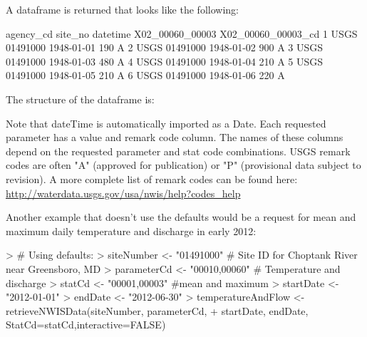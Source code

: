 \documentclass[a4paper,11pt]{article}
\begin{document}
A dataframe is returned that looks like the following:
\begin{Schunk}
\begin{Soutput}
  agency_cd  site_no   datetime X02_00060_00003 X02_00060_00003_cd
1      USGS 01491000 1948-01-01             190                  A
2      USGS 01491000 1948-01-02             900                  A
3      USGS 01491000 1948-01-03             480                  A
4      USGS 01491000 1948-01-04             210                  A
5      USGS 01491000 1948-01-05             210                  A
6      USGS 01491000 1948-01-06             220                  A
\end{Soutput}
\end{Schunk}
The structure of the dataframe is:
\begin{Schunk}
\end{Schunk}
Note that dateTime is automatically imported as a Date. Each requested parameter has a value and remark code column.  The names of these columns depend on the requested parameter and stat code combinations. USGS remark codes are often "A" (approved for publication) or "P" (provisional data subject to revision). A more complete list of remark codes can be found here:
\url{http://waterdata.usgs.gov/usa/nwis/help?codes_help}

Another example that doesn't use the defaults would be a request for mean and maximum daily temperature and discharge in early 2012:
\begin{Schunk}
\begin{Sinput}
> # Using defaults:
> siteNumber <- "01491000" # Site ID for Choptank River near Greensboro, MD
> parameterCd <- "00010,00060"  # Temperature and discharge
> statCd <- "00001,00003"  #mean and maximum
> startDate <- "2012-01-01"
> endDate <- "2012-06-30"
> temperatureAndFlow <- retrieveNWISData(siteNumber, parameterCd, 
+                   startDate, endDate, StatCd=statCd,interactive=FALSE)
\end{Sinput}
\end{Schunk}
\end{document}
